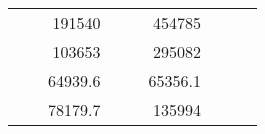 \begin{table}[H]
\begin{tabular}{|ccrccrccc}
\multicolumn{1}{|c|}{\cellcolor[HTML]{FFFFC7}}                                & \multicolumn{1}{c|}{\cellcolor[HTML]{DDFDFF}}                      & \multicolumn{1}{r|}{\cellcolor[HTML]{DAE8FC}191540}    & \multicolumn{1}{c|}{\cellcolor[HTML]{FFFFC7}}                                & \multicolumn{1}{c|}{\cellcolor[HTML]{DDFDFF}}                       & \multicolumn{1}{r|}{\cellcolor[HTML]{DDFDFF}454785}    &                                                                              &                                                                    &                                                        \\ \cline{3-3} \cline{6-6}
\multicolumn{1}{|c|}{\cellcolor[HTML]{FFFFC7}}                                & \multicolumn{1}{c|}{\cellcolor[HTML]{DDFDFF}}                      & \multicolumn{1}{r|}{\cellcolor[HTML]{DDFDFF}103653}    & \multicolumn{1}{c|}{\cellcolor[HTML]{FFFFC7}}                                & \multicolumn{1}{c|}{\cellcolor[HTML]{DDFDFF}}                       & \multicolumn{1}{r|}{\cellcolor[HTML]{DAE8FC}295082}    &                                                                              &                                                                    &                                                        \\ \cline{3-3} \cline{6-6}
\multicolumn{1}{|c|}{\cellcolor[HTML]{FFFFC7}}                                & \multicolumn{1}{c|}{\cellcolor[HTML]{DDFDFF}}                      & \multicolumn{1}{r|}{\cellcolor[HTML]{DAE8FC}64939.6}   & \multicolumn{1}{c|}{\cellcolor[HTML]{FFFFC7}}                                & \multicolumn{1}{c|}{\cellcolor[HTML]{DDFDFF}}                       & \multicolumn{1}{r|}{\cellcolor[HTML]{DDFDFF}65356.1}   &                                                                              &                                                                    &                                                        \\ \cline{3-3} \cline{6-6}
\multicolumn{1}{|c|}{\cellcolor[HTML]{FFFFC7}}                                & \multicolumn{1}{c|}{\cellcolor[HTML]{DDFDFF}}                      & \multicolumn{1}{r|}{\cellcolor[HTML]{DDFDFF}78179.7}   & \multicolumn{1}{c|}{\cellcolor[HTML]{FFFFC7}}                                & \multicolumn{1}{c|}{\cellcolor[HTML]{DDFDFF}}                       & \multicolumn{1}{r|}{\cellcolor[HTML]{DAE8FC}135994}    &                                                                              &                                                                    &                                                        \\ \cline{3-3} \cline{6-6}

\end{tabular}
\end{table}
